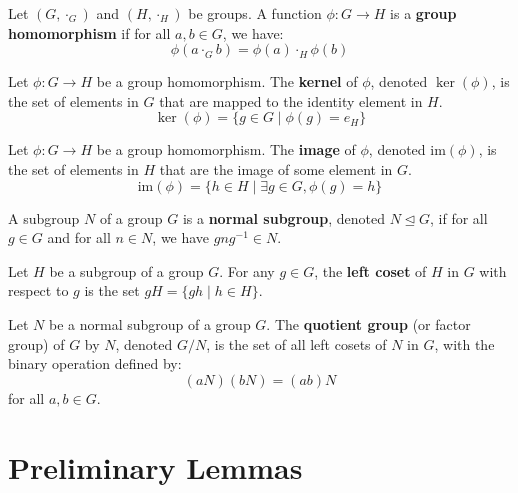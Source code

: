 \begin{definition}
\label{def:homomorphism}
Let $(G, \cdot_G)$ and $(H, \cdot_H)$ be groups. A function $\phi: G \to H$ is a \textbf{group homomorphism} if for all $a, b \in G$, we have:
$$ \phi(a \cdot_G b) = \phi(a) \cdot_H \phi(b) $$
\end{definition}

\begin{definition}
\label{def:kernel}
Let $\phi: G \to H$ be a group homomorphism. The \textbf{kernel} of $\phi$, denoted $\ker(\phi)$, is the set of elements in $G$ that are mapped to the identity element in $H$.
$$ \ker(\phi) = \{ g \in G \mid \phi(g) = e_H \} $$
\end{definition}

\begin{definition}
\label{def:image}
Let $\phi: G \to H$ be a group homomorphism. The \textbf{image} of $\phi$, denoted $\text{im}(\phi)$, is the set of elements in $H$ that are the image of some element in $G$.
$$ \text{im}(\phi) = \{ h \in H \mid \exists g \in G, \phi(g) = h \} $$
\end{definition}

\begin{definition}
\label{def:normal_subgroup}
A subgroup $N$ of a group $G$ is a \textbf{normal subgroup}, denoted $N \trianglelefteq G$, if for all $g \in G$ and for all $n \in N$, we have $gng^{-1} \in N$.
\end{definition}

\begin{definition}[Coset]
\label{def:coset}
Let $H$ be a subgroup of a group $G$. For any $g \in G$, the \textbf{left coset} of $H$ in $G$ with respect to $g$ is the set $gH = \{gh \mid h \in H\}$.
\end{definition}

\begin{definition}
\label{def:quotient_group}
Let $N$ be a normal subgroup of a group $G$. The \textbf{quotient group} (or factor group) of $G$ by $N$, denoted $G/N$, is the set of all left cosets of $N$ in $G$, with the binary operation defined by:
$$ (aN)(bN) = (ab)N $$
for all $a, b \in G$.
\end{definition}

\section{Preliminary Lemmas}

